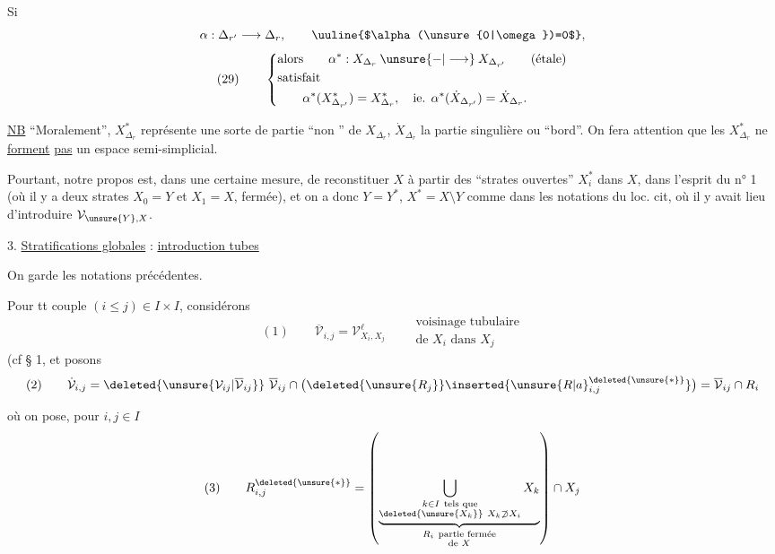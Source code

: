 Si
\[
\alpha:\Delta_{r'}\longrightarrow\Delta_r,\qquad \text{\uuline{$\alpha(\unsure{0|\omega})=0$}},
\]
\[
(29)\qquad\left\{\begin{aligned}
&\text{alors}\qquad \alpha^*:X_{\Delta_r}\mathbin{\unsure{-|\longrightarrow}}X_{\Delta_{r'}}\qquad(\text{étale})\\
&\text{satisfait}\\
&\qquad\alpha^*(X_{\Delta_{r'}}^*)=X_{\Delta_r}^*,\quad\text{ie. }\alpha^*(\dot X_{\Delta_{r'}})=\dot X_{\Delta_r}.
\end{aligned}\right.
\]


\uline{NB} ``Moralement'', $X_{\Delta_r}^*$ représente une sorte de partie ``non '' de $X_{\Delta_r}$, $\dot X_{\Delta_r}$ la partie singulière ou ``bord''. On fera attention que les $X_{\Delta_r}^*$ ne \uline{forment} \uline{pas} un espace semi-simplicial.

Pourtant, notre propos est, dans une certaine mesure, de reconstituer $X$ à partir des ``strates ouvertes'' $X_i^*$ dans $X$, dans l'esprit du n° 1 (où il y a deux strates $X_0=Y$ et $X_1=X$,   fermée), et on a donc $Y=Y^*$, $X^*=X\setminus Y$ comme dans les notations du loc. cit, où il y avait lieu d'introduire $\mathcal{V}_{\unsure{Y},X}$.

3. \uline{Stratifications globales} : \uline{introduction  tubes}

On garde les notations précédentes.

Pour tt couple $(i\leq j)\in I\times I$, considérons
\[
(1)\qquad \overline{\mathcal V}_{i,j}=\mathcal V^{\ell}_{X_i,X_j}\qquad
\begin{gathered}\text{voisinage tubulaire}\\\text{de }X_i\text{ dans }X_j\end{gathered}
\]
(cf § 1\unsure{)}, et posons
\[
(2)\qquad\dot{\mathcal V}_{i,j}=\deleted{\unsure{\mathcal V_{ij}|\overline{\mathcal V}_{ij}}}\ \overline{\mathcal V}_{ij}\cap\bigl(\deleted{\unsure{R_j}}\inserted{\unsure{R|a}_{i,j}^{\deleted{\unsure{*}}}}\bigr)=\overline{\mathcal V}_{ij}\cap R_i
\]

où on pose, pour $i,j\in I$
\[
(3)\qquad R_{i,j}^{\deleted{\unsure{*}}}=\left(
\underbrace{\bigcup_{\substack{k\in I\ \text{tels que}\\\deleted{\unsure{X_k}}\ X_k\not\supset X_i}}X_k}_{\substack{R_i\ \text{partie fermée}\\\text{de }X}}
\right)\cap X_j
\]

